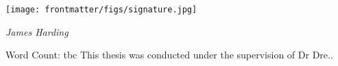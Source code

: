 \documentclass[
  a4paper,
  twoside]{uoe-thesis-template}
\begin{document}
\begin{romanpages}

\maketitle


\begin{dedication}
    
\end{dedication}


\begin{declaration}
	
    \vspace{0.5em}
    \begin{flushright}
      \texttt{[image: frontmatter/figs/signature.jpg]}
    \end{flushright}
    \vspace{0.5em}
    \begin{flushright}
      {\large \textit{James Harding}}
    \end{flushright}
    \vspace{0.5em}
    \noindent Word Count: tbc
    \vfill
    \noindent This thesis was conducted under the supervision of Dr
Dre..
    \vspace{2cm}
\end{declaration}


\begin{abstract}
	
\end{abstract}


\begin{acknowledgements}
 	
\end{acknowledgements}

\flushbottom

\tableofcontents

\listoffigures

\listoftables

\end{romanpages}
\end{document}
